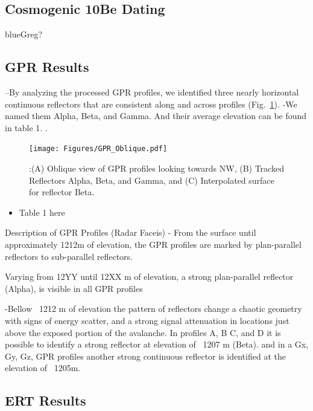\documentclass[5p]{elsarticle}
\newcommand{\COMON}{\begin{color}{blue}}
\newcommand{\COMOFF}{\end{color}}
\begin{document}
\subsection{Cosmogenic 10Be Dating}

\COMON Greg? \COMOFF



\subsection{GPR Results}

–By analyzing the processed GPR profiles, we identified three nearly horizontal continuous reflectors that are consistent along and across profiles (Fig.~\ref{GPR_Oblique}). -We named them Alpha, Beta, and Gamma.  And their average elevation can be found in table 1. 
. 

								 \begin{figure}[h]

	\texttt{[image: Figures/GPR\_Oblique.pdf]}
		\caption{:(A) Oblique view of GPR profiles looking towards NW, (B) Tracked Reflectors Alpha, Beta, and Gamma, and (C) Interpolated surface for reflector Beta. \label{GPR_Oblique}}

								   \end{figure}
								   
\begin{itemize}
    \item Table 1 here
\end{itemize}			   



Description of GPR Profiles (Radar Faceis)
- From the surface until approximately 1212m of elevation, the GPR profiles are marked by plan-parallel reflectors to sub-parallel reflectors.


Varying from 12YY until 12XX m of elevation, a strong plan-parallel reflector (Alpha), is visible in all GPR profiles


-Bellow ~1212 m of elevation the pattern of reflectors change a chaotic geometry with signs of energy scatter, and a strong signal attenuation in locations just above the exposed portion of the avalanche. In profiles A, B C, and D it is possible to identify a strong reflector at elevation of ~1207 m (Beta). and in a Gx,  Gy, Gz, GPR profiles another strong continuous reflector is identified at the elevation of ~1205m.
								   
								   
								   
\subsection{ERT Results}
\end{document}
